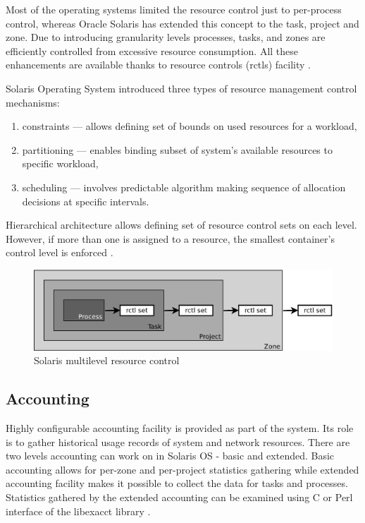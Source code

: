 \documentclass[11pt,openany]{book}
\begin{document}
      Most of the operating systems limited the resource control just to per-process control, whereas Oracle Solaris has
      extended this concept to the task, project and zone. Due to introducing granularity levels processes, tasks, and
      zones are efficiently controlled from excessive resource consumption. All these enhancements are available thanks
      to resource controls (rctls) facility \cite{oracle_admin_guide}.
      
      Solaris Operating System introduced three types of resource management control mechanisms:

      \begin{enumerate}
        \item constraints --- allows defining set of bounds on used resources for a workload,
        \item partitioning --- enables binding subset of system's available resources to specific workload,
        \item scheduling --- involves predictable algorithm making sequence of allocation decisions at specific
                             intervals.
      \end{enumerate}

      Hierarchical architecture allows defining set of resource control sets on each level. However, if more than one is
      assigned to a resource, the smallest container's control level is enforced \cite{oracle_admin_guide}. 

      \begin{figure}[H]
        \centering
        \includegraphics[width=.7\textwidth]{img/solaris/multi.pdf}

        \caption{Solaris multilevel resource control}
		  \end{figure}


      \subsection{Accounting}
      \label{sub:sol:acct}

        Highly configurable accounting facility is provided as part of the system. Its role is to gather historical
        usage records of system and network resources. There are two levels accounting can work on in Solaris
        OS - basic and extended. Basic accounting allows for per-zone and per-project statistics gathering while
        extended accounting facility makes it possible to collect the data for tasks and processes. Statistics gathered
        by the extended accounting can be examined using C or Perl interface of the libexacct library \cite{sag}.
\end{document}
